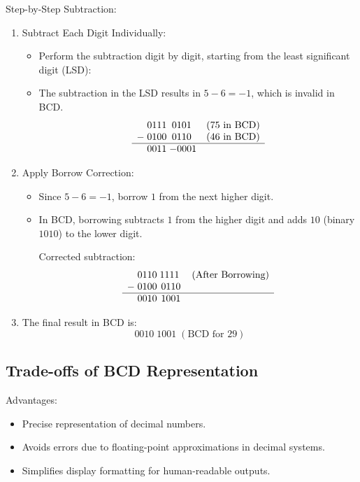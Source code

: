 \vspace{\baselineskip}\par
Step-by-Step Subtraction:
\begin{enumerate}
    \item Subtract Each Digit Individually:
    \begin{itemize}
        \item Perform the subtraction digit by digit, starting from the least significant digit (LSD):
        \item The subtraction in the LSD results in \( 5 - 6 = -1 \), which is invalid in BCD.
           \[
           \begin{array}{c@{\;}c@{\;}cc}
           & 0111 & 0101 \; & (\text{75 in BCD}) \\
           - & 0100 & 0110 \; &(\text{46 in BCD}) \\
           \hline
           & 0011 & -0001 &
           \end{array}
           \]
    \end{itemize}

    \item Apply Borrow Correction:
    \begin{itemize}
        \item Since \( 5 - 6 = -1 \), borrow \( 1 \) from the next higher digit.
        \item In BCD, borrowing subtracts \( 1 \) from the higher digit and adds \( 10 \) (binary \( 1010 \)) to the lower digit.

    \vspace{\baselineskip}\par
   Corrected subtraction:
   \[
   \begin{array}{c@{\;}c@{\;}cc}
   & 0110 & 1111 \; & (\text{After Borrowing}) \\
   - & 0100 & 0110 & \\
   \hline
   & 0010 &  1001  &
   \end{array}
   \]
    \end{itemize}

    \item The final result in BCD is:
     \[
     0010 \; 1001 \; (\text{BCD for } 29)
     \]

\end{enumerate}

\subsection{Trade-offs of BCD Representation}
Advantages:
    \begin{itemize}
        \item Precise representation of decimal numbers.
        \item Avoids errors due to floating-point approximations in decimal systems.
        \item Simplifies display formatting for human-readable outputs.
    \end{itemize}
    
